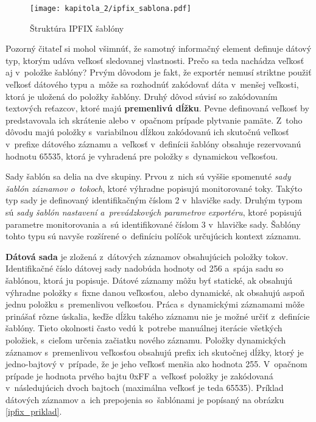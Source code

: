 \begin{figure*}[ht]
    \centering
    \texttt{[image: kapitola\_2/ipfix\_sablona.pdf]}
    \caption{Štruktúra IPFIX šablóny}
    \label{ipfix_sablona}
\end{figure*}

Pozorný čitateľ si mohol všimnúť, že samotný informačný element definuje dátový typ, ktorým udáva veľkosť sledovanej vlastnosti. Prečo sa teda nachádza veľkosť aj v~položke šablóny? Prvým dôvodom je fakt, že exportér nemusí striktne použiť veľkosť dátového
typu a~môže sa rozhodnúť zakódovať dáta v~menšej veľkosti, ktorá je uložená do položky šablóny. Druhý dôvod súvisí so zakódovaním textových reťazcov, ktoré majú \textbf{premenlivú dĺžku}. Pevne definovaná veľkosť by predstavovala ich skrátenie alebo v~opačnom prípade
plytvanie pamäte. Z~toho dôvodu majú položky s~variabilnou dĺžkou zakódovanú ich skutočnú veľkosť v~prefixe dátového záznamu a~veľkosť v~definícii šablóny obsahuje rezervovanú hodnotu 65535, ktorá je vyhradená pre položky s~dynamickou veľkosťou.

Sady šablón sa delia na dve skupiny. Prvou z~nich sú vyššie spomenuté \textit{sady šablón záznamov o~tokoch}, ktoré výhradne popisujú monitorované toky. Takýto typ sady je definovaný identifikačným číslom 2 v~hlavičke sady. Druhým typom sú \textit{sady šablón nastavení
a~prevádzkových parametrov exportéru}, ktoré popisujú parametre monitorovania a~sú identifikované číslom 3 v~hlavičke sady. Šablóny tohto typu sú navyše rozšírené o~definíciu políčok určujúcich kontext záznamu.

\textbf{Dátová sada} je zložená z~dátových záznamov obsahujúcich položky tokov. Identifikačné číslo dátovej sady nadobúda hodnoty od 256 a~spája sadu so šablónou, ktorá ju popisuje. Dátové záznamy môžu byť statické, ak obsahujú výhradne položky s~fixne danou veľkosťou,
alebo dynamické, ak obsahujú aspoň jednu položku s~premenlivou veľkosťou. Práca s~dynamickými záznamami môže prinášať rôzne úskalia, keďže dĺžku takého záznamu nie je možné určiť z~definície šablóny. Tieto okolnosti často vedú k~potrebe manuálnej iterácie všetkých položiek,
s~cieľom určenia začiatku nového záznamu. Položky dynamických záznamov s~premenlivou veľkosťou obsahujú prefix ich skutočnej dĺžky, ktorý je jedno-bajtový v~prípade, že je jeho veľkosť menšia ako hodnota 255. V~opačnom prípade je hodnota prvého bajtu 0xFF a~veľkosť položky
je zakódovaná v~následujúcich dvoch bajtoch (maximálna veľkosť je teda 65535). Príklad dátových záznamov a~ich prepojenia so~šablónami je popísaný na obrázku \ref{ipfix_priklad}.

